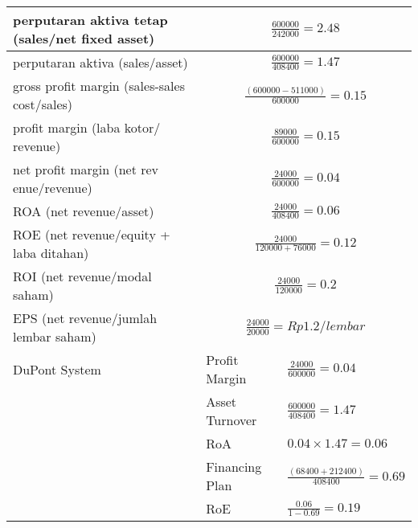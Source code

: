 \documentclass{article}
\begin{document}
\begin{center}
\begin{tabular}{ |p{7cm}|p{3.5cm}|p{3.5cm}|}
      perputaran aktiva tetap (sales/net fixed asset)  & \multicolumn{2}{|c|}{$\frac{600000}{242000}=2.48$} \\ 
      \hline
      perputaran aktiva (sales/asset)  & \multicolumn{2}{|c|}{$\frac{600000}{408400}=1.47$} \\ 
      \hline
      gross profit margin  (sales-sales cost/sales)  & \multicolumn{2}{|c|}{$\frac{(600000-511000)}{600000}=0.15$} \\ 
      \hline
      profit margin  (laba kotor/ revenue)  & \multicolumn{2}{|c|}{$\frac{89000}{600000}=0.15$} \\ 
      \hline
      net profit margin  (net rev enue/revenue)  & \multicolumn{2}{|c|}{$\frac{24000}{600000}=0.04$} \\ 
      \hline
      ROA (net revenue/asset)  & \multicolumn{2}{|c|}{$\frac{24000}{408400}=0.06$} \\ 
      \hline
      ROE (net revenue/equity + laba ditahan)  & \multicolumn{2}{|c|}{$\frac{24000}{120000+76000}=0.12$} \\ 
      \hline
      ROI (net revenue/modal saham)  & \multicolumn{2}{|c|}{$\frac{24000}{120000}=0.2$} \\ 
      \hline
      EPS (net revenue/jumlah lembar saham)  & \multicolumn{2}{|c|}{$\frac{24000}{20000}=Rp 1.2/lembar$} \\ 
      \hline
      DuPont System  & Profit Margin & $\frac{24000}{600000}=0.04$ \\
       & Asset Turnover & $\frac{600000}{408400}=1.47$ \\ 
       & RoA & $0.04\times1.47=0.06$ \\ 
       & Financing Plan & $\frac{(68400+212400)}{408400}=0.69$ \\ 
       & RoE & $\frac{0.06}{1-0.69}=0.19$ \\ 
      \hline 
    \end{tabular}
\end{center}
\renewcommand{\arraystretch}{1}
\end{document}
